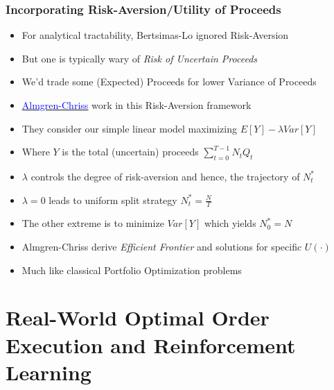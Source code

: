 \documentclass[handout]{beamer}
\begin{document}
\begin{frame}
\frametitle{Incorporating Risk-Aversion/Utility of Proceeds}
\pause
\begin{itemize}[<+->]
\item For analytical tractability, Bertsimas-Lo ignored Risk-Aversion
\item But one is typically wary of {\em Risk of Uncertain Proceeds}
\item We'd trade some (Expected) Proceeds for lower Variance of Proceeds
\item \href{https://www.math.nyu.edu/faculty/chriss/optliq_f.pdf}{\underline{\textcolor{blue}{Almgren-Chriss}}} work in this Risk-Aversion framework
\item They consider our simple linear model maximizing $E[Y] - \lambda Var[Y]$
\item Where $Y$ is the total (uncertain) proceeds $\sum_{t=0}^{T-1} N_t Q_t$
\item $\lambda$ controls the degree of risk-aversion and hence, the trajectory of $N_t^*$
\item $\lambda = 0$ leads to uniform split strategy $N_t^* = \frac N T$
\item The other extreme is to minimize $Var[Y]$ which yields $N_0^* = N$
\item Almgren-Chriss derive {\em Efficient Frontier} and solutions for specific $U(\cdot)$
\item Much like classical Portfolio Optimization problems
\end{itemize}
\end{frame}

\section{Real-World Optimal Order Execution and Reinforcement Learning}
\end{document}
